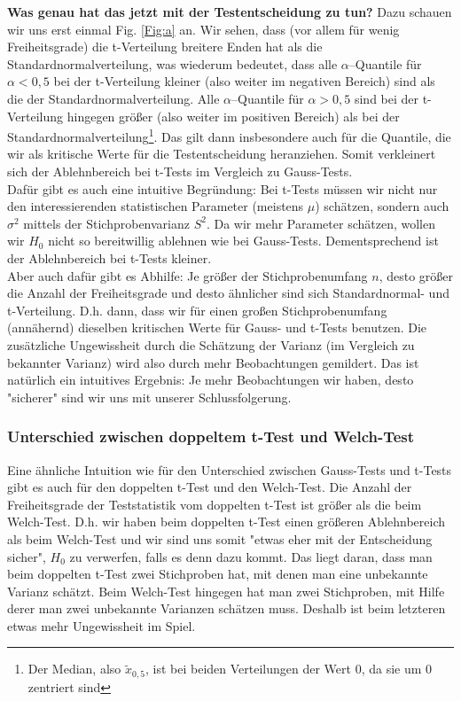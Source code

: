 \documentclass[a4paper]{article}
\begin{document}
\noindent \textbf{Was genau hat das jetzt mit der Testentscheidung zu tun?} Dazu schauen wir uns erst einmal Fig. \ref{Fig:a} an. Wir sehen, dass (vor allem für wenig Freiheitsgrade) die t-Verteilung breitere Enden hat als die Standardnormalverteilung, was wiederum bedeutet, dass alle $\alpha$--Quantile für $\alpha < 0,5$ bei der t-Verteilung kleiner (also weiter im negativen Bereich) sind als die der Standardnormalverteilung. Alle $\alpha$--Quantile für $\alpha > 0,5$ sind bei der t-Verteilung hingegen größer (also weiter im positiven Bereich) als bei der Standardnormalverteilung\footnote{Der Median, also $\tilde{x}_{0,5}$, ist bei beiden Verteilungen der Wert 0, da sie um 0 zentriert sind}. Das gilt dann insbesondere auch für die Quantile, die wir als kritische Werte für die Testentscheidung heranziehen. Somit verkleinert sich der Ablehnbereich bei t-Tests im Vergleich zu Gauss-Tests. \\

\noindent Dafür gibt es auch eine intuitive Begründung: Bei t-Tests müssen wir nicht nur den interessierenden statistischen Parameter (meistens $\mu$) schätzen, sondern auch $\sigma^2$ mittels der Stichprobenvarianz $S^2$. Da wir mehr Parameter schätzen, wollen wir $H_0$ nicht so bereitwillig ablehnen wie bei Gauss-Tests. Dementsprechend ist der Ablehnbereich bei t-Tests kleiner. \\

\noindent Aber auch dafür gibt es Abhilfe: Je größer der Stichprobenumfang $n$, desto größer die Anzahl der Freiheitsgrade und desto ähnlicher sind sich Standardnormal- und t-Verteilung. D.h. dann, dass wir für einen großen Stichprobenumfang (annähernd) dieselben kritischen Werte für Gauss- und t-Tests benutzen. Die zusätzliche Ungewissheit durch die Schätzung der Varianz (im Vergleich zu bekannter Varianz) wird also durch mehr Beobachtungen gemildert. Das ist natürlich ein intuitives Ergebnis: Je mehr Beobachtungen wir haben, desto "sicherer" sind wir uns mit unserer Schlussfolgerung.

\subsubsection{Unterschied zwischen doppeltem t-Test und Welch-Test}\label{sec:t2vsWelch}
Eine ähnliche Intuition wie für den Unterschied zwischen Gauss-Tests und t-Tests gibt es auch für den doppelten t-Test und den Welch-Test. Die Anzahl der Freiheitsgrade der Teststatistik vom doppelten t-Test ist größer als die beim Welch-Test. D.h. wir haben beim doppelten t-Test einen größeren Ablehnbereich als beim Welch-Test und wir sind uns somit "etwas eher mit der Entscheidung sicher", $H_0$ zu verwerfen, falls es denn dazu kommt. Das liegt daran, dass man beim doppelten t-Test zwei Stichproben hat, mit denen man eine unbekannte Varianz schätzt. Beim Welch-Test hingegen hat man zwei Stichproben, mit Hilfe derer man zwei unbekannte Varianzen schätzen muss. Deshalb ist beim letzteren etwas mehr Ungewissheit im Spiel.
\end{document}
